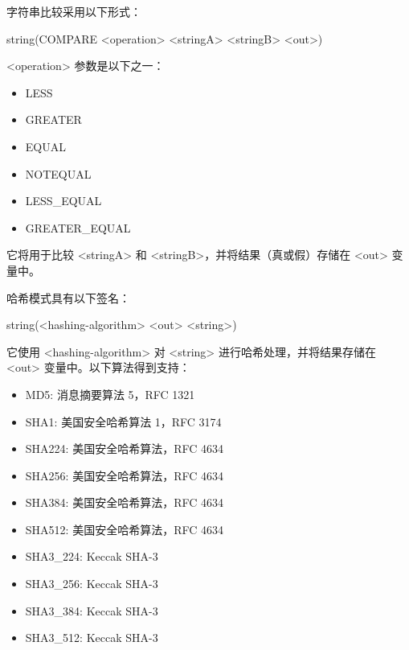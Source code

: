 
字符串比较采用以下形式：

\begin{cmake}
string(COMPARE <operation> <stringA> <stringB> <out>)
\end{cmake}

<operation> 参数是以下之一：

\begin{itemize}
\item
LESS

\item
GREATER

\item
EQUAL

\item
NOTEQUAL

\item
LESS\_EQUAL

\item
GREATER\_EQUAL
\end{itemize}

它将用于比较 <stringA> 和 <stringB>，并将结果（真或假）存储在 <out> 变量中。


哈希模式具有以下签名：

\begin{cmake}
string(<hashing-algorithm> <out> <string>)
\end{cmake}

它使用 <hashing-algorithm> 对 <string> 进行哈希处理，并将结果存储在 <out> 变量中。以下算法得到支持：

\begin{itemize}
\item
MD5: 消息摘要算法 5，RFC 1321

\item
SHA1: 美国安全哈希算法 1，RFC 3174

\item
SHA224: 美国安全哈希算法，RFC 4634

\item
SHA256: 美国安全哈希算法，RFC 4634

\item
SHA384: 美国安全哈希算法，RFC 4634

\item
SHA512: 美国安全哈希算法，RFC 4634

\item
SHA3\_224: Keccak SHA-3

\item
SHA3\_256: Keccak SHA-3

\item
SHA3\_384: Keccak SHA-3

\item
SHA3\_512: Keccak SHA-3
\end{itemize}

